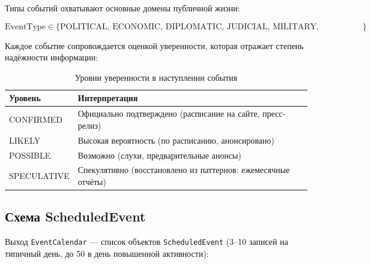 Типы событий охватывают основные домены публичной жизни:

\begin{equation}
\text{EventType} \in \{\text{POLITICAL, ECONOMIC, DIPLOMATIC, JUDICIAL, MILITARY, CULTURAL, SCIENTIFIC, SPORTS, OTHER}\}
\end{equation}

Каждое событие сопровождается оценкой уверенности, которая отражает степень надёжности информации:

\begin{table}[h!]
\centering
\caption{Уровни уверенности в наступлении события}
\label{tab:event_certainty}
\begin{tabular}{|l|l|}
\hline
\textbf{Уровень} & \textbf{Интерпретация} \\
\hline
CONFIRMED & Официально подтверждено (расписание на сайте, пресс-релиз) \\
LIKELY & Высокая вероятность (по расписанию, анонсировано) \\
POSSIBLE & Возможно (слухи, предварительные анонсы) \\
SPECULATIVE & Спекулятивно (восстановлено из паттернов: ежемесячные отчёты) \\
\hline
\end{tabular}
\end{table}


\subsection{Схема ScheduledEvent}

Выход \texttt{EventCalendar} --- список объектов \texttt{ScheduledEvent} (3--10 записей на типичный день, до 50 в день повышенной активности):

